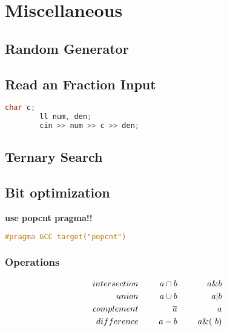 \chapter{Miscellaneous}

\section{Random Generator}


\section{Read an Fraction Input}

    \begin{lstlisting}[language=c++]
        char c;
        ll num, den;
        cin >> num >> c >> den;
    \end{lstlisting}
    
\section{Ternary Search}


\section{Bit optimization}

    \textbf{use popcnt pragma!!}

    \begin{lstlisting}[language=c++]
    #pragma GCC target("popcnt")
    \end{lstlisting}

    \subsection{Operations}

    \begin{align*}
        intersection & \hspace{5mm} & a \cap b     & \hspace{5mm} &  a \& b \\
        union        & \hspace{5mm} & a  \cup b    & \hspace{5mm} &  a | b \\
        complement   & \hspace{5mm} & \overline{a} & \hspace{5mm} &  ~a \\
        difference   & \hspace{5mm} & a - b        & \hspace{5mm} &  a \& (~b) \\
    \end{align*}

